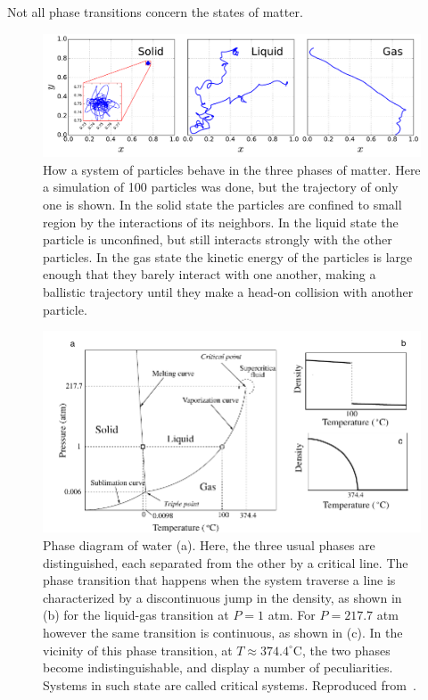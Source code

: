 Not all phase transitions concern the states of matter.


\begin{figure}[h]
\begin{center}
    \includegraphics[scale=0.4]{chapters/ch2-crit/figs/phases}
\end{center}
\caption{How a system of particles behave in the three phases of matter. Here a
    simulation of 100 particles was done, but the trajectory of only one is
    shown. In the solid state the particles are confined to small region by
    the interactions of its neighbors. In the liquid state the particle is
    unconfined, but still interacts strongly with the other particles. In the
    gas state the kinetic energy of the particles is large enough that they
    barely interact with one another, making a ballistic trajectory until
    they make a head-on collision with another particle.}
\label{fig:phases}
\end{figure}


\begin{figure}[h]
\begin{center}
    \includegraphics[scale=1.0]{chapters/ch2-crit/figs/water}
\end{center}
\caption{Phase diagram of water (a). Here, the three usual phases are
    distinguished, each separated from the other by a critical line. The phase
    transition that happens when the system traverse a line is characterized by
    a discontinuous jump in the density, as shown in (b) for the liquid-gas
    transition at $P=1$ atm. For $P=217.7$ atm however the same transition is
    continuous, as shown in (c). In the vicinity of this phase transition, at
    $T\approx374.4^\circ$C, the two phases become indistinguishable, and
    display a number of peculiarities. Systems in such state are called
    critical systems. Reproduced from~\cite{Sole2011}.}
\label{fig:water}
\end{figure}


